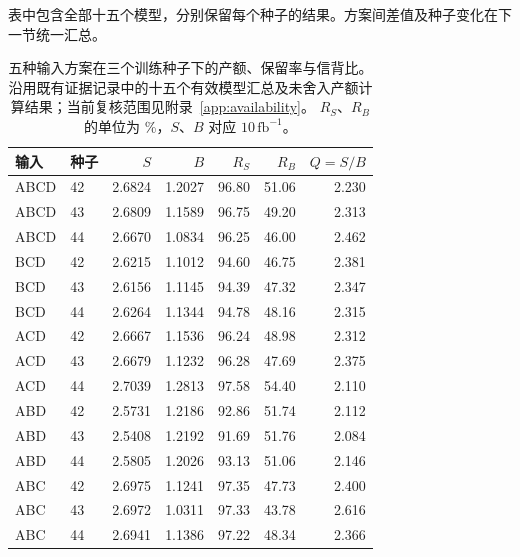 \documentclass[11pt,a4paper,fontset=fandol,scheme=plain]{ctexart}
\begin{document}
表中包含全部十五个模型，分别保留每个种子的结果。方案间差值及种子变化在下一节统一汇总。
\begin{table}[H]
\caption{五种输入方案在三个训练种子下的产额、保留率与信背比。沿用既有证据记录中的十五个有效模型汇总及未舍入产额计算结果；当前复核范围见附录~\ref{app:availability}。
$R_S$、$R_B$ 的单位为 \%，$S$、$B$ 对应 $10\,\mathrm{fb}^{-1}$。}
\label{tab:basic-all}
\centering\small
\begin{tabular}{llrrrrr}
\toprule
输入 & 种子 & $S$ & $B$ & $R_S$ & $R_B$ & $Q=S/B$ \\
\midrule
ABCD & 42 & 2.6824 & 1.2027 & 96.80 & 51.06 & 2.230 \\
ABCD & 43 & 2.6809 & 1.1589 & 96.75 & 49.20 & 2.313 \\
ABCD & 44 & 2.6670 & 1.0834 & 96.25 & 46.00 & 2.462 \\
\addlinespace
BCD & 42 & 2.6215 & 1.1012 & 94.60 & 46.75 & 2.381 \\
BCD & 43 & 2.6156 & 1.1145 & 94.39 & 47.32 & 2.347 \\
BCD & 44 & 2.6264 & 1.1344 & 94.78 & 48.16 & 2.315 \\
\addlinespace
ACD & 42 & 2.6667 & 1.1536 & 96.24 & 48.98 & 2.312 \\
ACD & 43 & 2.6679 & 1.1232 & 96.28 & 47.69 & 2.375 \\
ACD & 44 & 2.7039 & 1.2813 & 97.58 & 54.40 & 2.110 \\
\addlinespace
ABD & 42 & 2.5731 & 1.2186 & 92.86 & 51.74 & 2.112 \\
ABD & 43 & 2.5408 & 1.2192 & 91.69 & 51.76 & 2.084 \\
ABD & 44 & 2.5805 & 1.2026 & 93.13 & 51.06 & 2.146 \\
\addlinespace
ABC & 42 & 2.6975 & 1.1241 & 97.35 & 47.73 & 2.400 \\
ABC & 43 & 2.6972 & 1.0311 & 97.33 & 43.78 & 2.616 \\
ABC & 44 & 2.6941 & 1.1386 & 97.22 & 48.34 & 2.366 \\
\bottomrule
\end{tabular}
\end{table}
\end{document}

